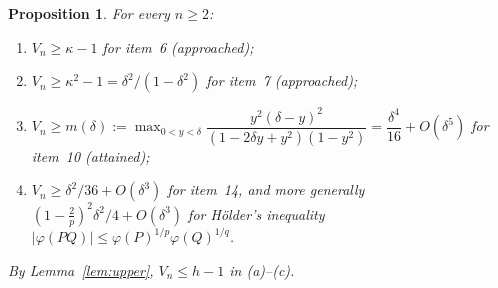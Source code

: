 \documentclass[11pt]{article}
\theoremstyle{plain}
\newtheorem{proposition}[theorem]{Proposition}
\theoremstyle{definition}
\theoremstyle{remark}
\begin{document}
\begin{proposition}\label{prop:lower}
For every $n\ge2$:
\begin{enumerate}
\item[(a)] $V_n\ge\kappa-1$ for item~6 (approached);
\item[(b)] $V_n\ge\kappa^2-1=\delta^2/(1-\delta^2)$ for item~7 (approached);
\item[(c)] $V_n\ge m(\delta):=\max_{0<y<\delta}\dfrac{y^2(\delta-y)^2}{(1-2\delta y+y^2)(1-y^2)}=\dfrac{\delta^4}{16}+O(\delta^5)$
for item~10 (attained);
\item[(d)] $V_n\ge\delta^2/36+O(\delta^3)$ for item~14, and more generally
$(1-\frac2p)^2\delta^2/4+O(\delta^3)$ for Hölder's inequality $|\varphi(PQ)|\le\varphi(P)^{1/p}\varphi(Q)^{1/q}$.
\end{enumerate}
By Lemma~\ref{lem:upper}, $V_n\le h-1$ in (a)--(c).
\end{proposition}
\end{document}
